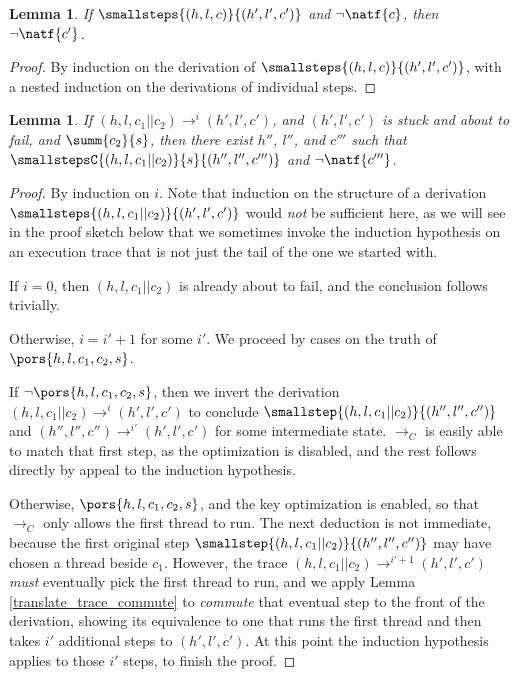 \documentclass{amsbook}
\newtheorem{lemma}[theorem]{Lemma}
\theoremstyle{definition}
\theoremstyle{remark}
\numberwithin{section}{chapter}
\numberwithin{equation}{chapter}
\begin{document}
\begin{lemma}\label{stillFailing}
  If $\smallsteps{(h, l, c)}{(h', l', c')}$ and $\neg \natf{c}$, then $\neg \natf{c'}$.
\end{lemma}
\begin{proof}
  By induction on the derivation of $\smallsteps{(h, l, c)}{(h', l', c')}$, with a nested induction on the derivations of individual steps.
\end{proof}

\begin{lemma}\label{translate_trace}
  If $(h, l, c_1 || c_2) \to^i (h', l', c')$, and $(h', l', c')$ is stuck and about to fail, and $\summ{c_2}{s}$, then there exist $h''$, $l''$, and $c'''$ such that $\smallstepsC{(h, l, c_1 || c_2)}{s}{(h'', l'', c''')}$ and $\neg \natf{c'''}$.
\end{lemma}
\begin{proof}
  By induction on $i$.
  Note that induction on the structure of a derivation $\smallsteps{(h, l, c_1 || c_2)}{(h', l', c')}$ would \emph{not} be sufficient here, as we will see in the proof sketch below that we sometimes invoke the induction hypothesis on an execution trace that is not just the tail of the one we started with.

  If $i = 0$, then $(h, l, c_1 || c_2)$ is already about to fail, and the conclusion follows trivially.

  Otherwise, $i = i' + 1$ for some $i'$.
  We proceed by cases on the truth of $\pors{h, l, c_1, c_2, s}$.

  If $\neg \pors{h, l, c_1, c_2, s}$, then we invert the derivation $(h, l, c_1 || c_2) \to^i (h', l', c')$ to conclude $\smallstep{(h, l, c_1 || c_2)}{(h'', l'', c'')}$ and $(h'', l'', c'') \to^{i'} (h', l', c')$ for some intermediate state.
  $\to_C$ is easily able to match that first step, as the optimization is disabled, and the rest follows directly by appeal to the induction hypothesis.

  Otherwise, $\pors{h, l, c_1, c_2, s}$, and the key optimization is enabled, so that $\to_C$ only allows the first thread to run.
  The next deduction is not immediate, because the first original step $\smallstep{(h, l, c_1 || c_2)}{(h'', l'', c'')}$ may have chosen a thread beside $c_1$.
  However, the trace $(h, l, c_1 || c_2) \to^{i'+1} (h', l', c')$ \emph{must} eventually pick the first thread to run, and we apply Lemma \ref{translate_trace_commute} to \emph{commute} that eventual step to the front of the derivation, showing its equivalence to one that runs the first thread and then takes $i'$ additional steps to $(h', l', c')$.
  At this point the induction hypothesis applies to those $i'$ steps, to finish the proof.
\end{proof}
\end{document}

